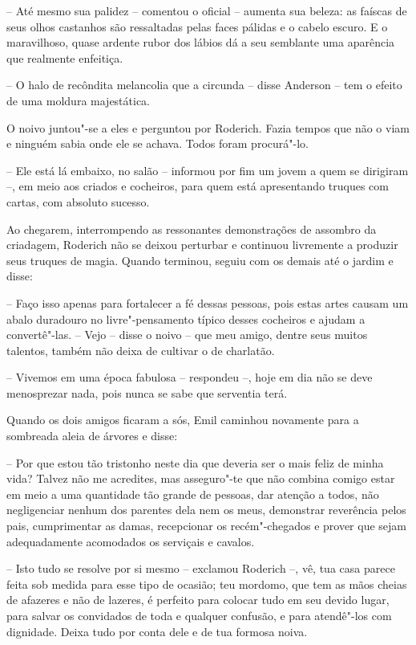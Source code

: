 -- Até mesmo sua palidez -- comentou o oficial -- aumenta sua beleza:
as faíscas de seus olhos castanhos são ressaltadas pelas faces pálidas
e o cabelo escuro. E o maravilhoso, quase ardente rubor dos
lábios dá a seu semblante uma aparência que realmente enfeitiça.

-- O halo de recôndita melancolia que a circunda -- disse Anderson --
tem o efeito de uma moldura majestática.

O noivo juntou"-se a eles e perguntou por Roderich. Fazia tempos que não
o viam e ninguém sabia onde ele se achava. Todos foram procurá"-lo.

-- Ele está lá embaixo, no salão -- informou por fim um jovem a quem
se dirigiram --, em meio aos criados e cocheiros, para quem está
apresentando truques com cartas, com absoluto sucesso.

Ao chegarem, interrompendo as ressonantes demonstrações de assombro da
criadagem, Roderich não se deixou perturbar e continuou livremente a
produzir seus truques de magia. Quando terminou, seguiu com os demais
até o jardim e disse:

-- Faço isso apenas para fortalecer a fé dessas pessoas, pois estas
artes causam um abalo duradouro no livre"-pensamento típico desses
cocheiros e ajudam a convertê"-las.
\pagebreak
-- Vejo -- disse o noivo -- que meu amigo, dentre seus muitos talentos,
também não deixa de cultivar o de charlatão.

-- Vivemos em uma época fabulosa -- respondeu --, hoje em dia não
se deve menosprezar nada, pois nunca se sabe que serventia terá.

Quando os dois amigos ficaram a sós, Emil caminhou novamente para a
sombreada aleia de árvores e disse:

-- Por que estou tão tristonho neste dia que deveria ser o mais
feliz de minha vida? Talvez não me acredites, mas asseguro"-te que não
combina comigo estar em meio a uma quantidade tão grande de pessoas,
dar atenção a todos, não negligenciar nenhum dos parentes dela nem os meus,
demonstrar reverência pelos pais, cumprimentar as damas, recepcionar os
recém"-chegados e prover que sejam adequadamente acomodados os serviçais
e cavalos.

-- Isto tudo se resolve por si mesmo -- exclamou Roderich --, vê, tua
casa parece feita sob medida para esse tipo de ocasião; teu mordomo,
que tem as mãos cheias de afazeres e não de lazeres, é perfeito para
colocar tudo em seu devido lugar, para salvar os convidados de toda e
qualquer confusão, e para atendê"-los com dignidade. Deixa tudo por
conta dele e de tua formosa noiva.

